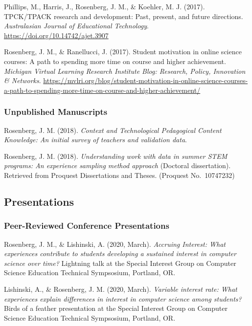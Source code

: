 \documentclass[14,]{article}
\begin{document}
Phillips, M., Harris, J., Rosenberg, J. M., \& Koehler, M. J. (2017).
TPCK/TPACK research and development: Past, present, and future
directions. \emph{Australasian Journal of Educational Technology}.
\url{https://doi.org/10.14742/ajet.3907}

Rosenberg, J. M., \& Ranellucci, J. (2017). Student motivation in online
science courses: A path to spending more time on course and higher
achievement. \emph{Michigan Virtual Learning Research Institute Blog:
Research, Policy, Innovation \& Networks}.
\url{https://mvlri.org/blog/student-motivation-in-online-science-courses-a-path-to-spending-more-time-on-course-and-higher-achievement/}

\hypertarget{unpublished-manuscripts}{%
\subsubsection{Unpublished Manuscripts}\label{unpublished-manuscripts}}

Rosenberg, J. M. (2018). \emph{Context and Technological Pedagogical
Content Knowledge: An initial survey of teachers and validation data}.

Rosenberg, J. M. (2018). \emph{Understanding work with data in summer
STEM programs: An experience sampling method approach} (Doctoral
dissertation). Retrieved from Proquest Dissertations and Theses.
(Proquest No.~10747232)

\hypertarget{presentations}{%
\subsection{Presentations}\label{presentations}}

\hypertarget{peer-reviewed-conference-presentations}{%
\subsubsection{Peer-Reviewed Conference
Presentations}\label{peer-reviewed-conference-presentations}}

Rosenberg, J. M., \& Lishinski, A. (2020, March). \emph{Accruing
Interest: What experiences contribute to students developing a sustained
interest in computer science over time?} Lightning talk at the Special
Interest Group on Computer Science Education Technical Sympsosium,
Portland, OR.

Lishinski, A., \& Rosenberg, J. M. (2020, March). \emph{Variable
interest rate: What experiences explain differences in interest in
computer science among students?} Birds of a feather presentation at the
Special Interest Group on Computer Science Education Technical
Sympsosium, Portland, OR.
\end{document}
